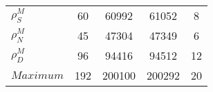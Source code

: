 \begin{center}
\begin{longtable}{lcccc}
$ {\rho^{M}_{S}}       $	 & 	                   60	 & 	                60992	 & 	                61052	 & 	                    8 \\ 
$ {\rho^{M}_{N}}       $	 & 	                   45	 & 	                47304	 & 	                47349	 & 	                    6 \\ 
$ {\rho^{M}_{D}}       $	 & 	                   96	 & 	                94416	 & 	                94512	 & 	                   12 \\ 
$Maximum               $	 & 	                  192	 & 	               200100	 & 	               200292	 & 	                   20 \\ 
\end{longtable}
 \end{center}
